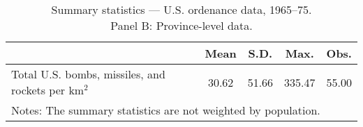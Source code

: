 \begin{table}[htbp]\centering
\def\sym#1{\ifmmode^{#1}\else\(^{#1}\)\fi}
\caption{Summary statistics — U.S. ordenance data, 1965–75. \\ Panel B: Province-level data.}
\begin{tabular}{l*{1}{cccc}}
\toprule
                    &        Mean&        S.D.&        Max.&        Obs.\\
\midrule
Total U.S. bombs, missiles, and rockets per km$^2$&       30.62&       51.66&      335.47&       55.00\\
\bottomrule
\multicolumn{5}{l}{\footnotesize Notes: The summary statistics are not weighted by population.}\\
\end{tabular}
\end{table}
